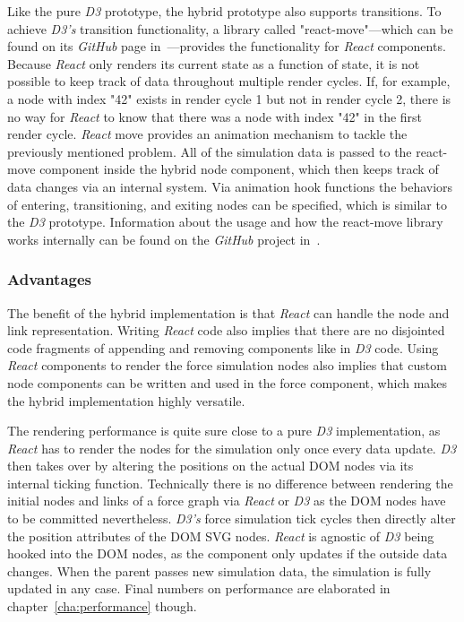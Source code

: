 Like the pure \emph{D3} prototype, the hybrid prototype also supports transitions. To achieve \emph{D3's} transition functionality, a library called "react-move"---which can be found on its \emph{GitHub} page in~\cite{ReactMove}---provides the functionality for \emph{React} components. Because \emph{React} only renders its current state as a function of state, it is not possible to keep track of data throughout multiple render cycles. If, for example, a node with index "42" exists in render cycle 1 but not in render cycle 2, there is no way for \emph{React} to know that there was a node with index "42" in the first render cycle. \emph{React} move provides an animation mechanism to tackle the previously mentioned problem. All of the simulation data is passed to the react-move component inside the hybrid node component, which then keeps track of data changes via an internal system. Via animation hook functions the behaviors of entering, transitioning, and exiting nodes can be specified, which is similar to the \emph{D3} prototype. Information about the usage and how the react-move library works internally can be found on the \emph{GitHub} project in~\cite{ReactMove}.


\subsubsection{Advantages}

The benefit of the hybrid implementation is that \emph{React} can handle the node and link representation. Writing \emph{React} code also implies that there are no disjointed code fragments of appending and removing components like in \emph{D3} code. Using \emph{React} components to render the force simulation nodes also implies that custom node components can be written and used in the force component, which makes the hybrid implementation highly versatile.

The rendering performance is quite sure close to a pure \emph{D3} implementation, as \emph{React} has to render the nodes for the simulation only once every data update. \emph{D3} then takes over by altering the positions on the actual DOM nodes via its internal ticking function. Technically there is no difference between rendering the initial nodes and links of a force graph via \emph{React} or \emph{D3} as the DOM nodes have to be committed nevertheless. \emph{D3's} force simulation tick cycles then directly alter the position attributes of the DOM SVG nodes. \emph{React} is agnostic of \emph{D3} being hooked into the DOM nodes, as the component only updates if the outside data changes. When the parent passes new simulation data, the simulation is fully updated in any case. Final numbers on performance are elaborated in chapter~\ref{cha:performance} though.

